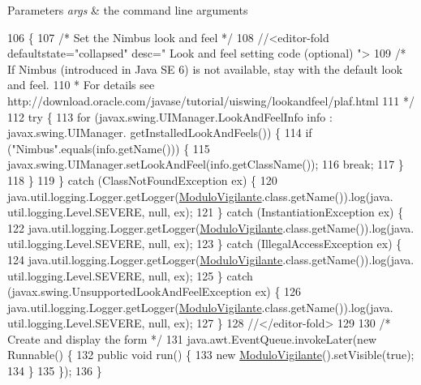 \begin{DoxyParams}{Parameters}
{\em args} & the command line arguments \\
\hline
\end{DoxyParams}

\begin{DoxyCode}
106                                            \{
107         \textcolor{comment}{/* Set the Nimbus look and feel */}
108         \textcolor{comment}{//<editor-fold defaultstate="collapsed" desc=" Look and feel setting code (optional) ">}
109         \textcolor{comment}{/* If Nimbus (introduced in Java SE 6) is not available, stay with the default look and feel.}
110 \textcolor{comment}{         * For details see http://download.oracle.com/javase/tutorial/uiswing/lookandfeel/plaf.html }
111 \textcolor{comment}{         */}
112         \textcolor{keywordflow}{try} \{
113             \textcolor{keywordflow}{for} (javax.swing.UIManager.LookAndFeelInfo info : javax.swing.UIManager.
      getInstalledLookAndFeels()) \{
114                 \textcolor{keywordflow}{if} (\textcolor{stringliteral}{"Nimbus"}.equals(info.getName())) \{
115                     javax.swing.UIManager.setLookAndFeel(info.getClassName());
116                     \textcolor{keywordflow}{break};
117                 \}
118             \}
119         \} \textcolor{keywordflow}{catch} (ClassNotFoundException ex) \{
120             java.util.logging.Logger.getLogger(\mbox{\hyperlink{classpecl6part2_1_1_modulo_vigilante_a1ae677df7d37e3ef8303a33e80513d0f}{ModuloVigilante}}.class.getName()).log(java.
      util.logging.Level.SEVERE, null, ex);
121         \} \textcolor{keywordflow}{catch} (InstantiationException ex) \{
122             java.util.logging.Logger.getLogger(\mbox{\hyperlink{classpecl6part2_1_1_modulo_vigilante_a1ae677df7d37e3ef8303a33e80513d0f}{ModuloVigilante}}.class.getName()).log(java.
      util.logging.Level.SEVERE, null, ex);
123         \} \textcolor{keywordflow}{catch} (IllegalAccessException ex) \{
124             java.util.logging.Logger.getLogger(\mbox{\hyperlink{classpecl6part2_1_1_modulo_vigilante_a1ae677df7d37e3ef8303a33e80513d0f}{ModuloVigilante}}.class.getName()).log(java.
      util.logging.Level.SEVERE, null, ex);
125         \} \textcolor{keywordflow}{catch} (javax.swing.UnsupportedLookAndFeelException ex) \{
126             java.util.logging.Logger.getLogger(\mbox{\hyperlink{classpecl6part2_1_1_modulo_vigilante_a1ae677df7d37e3ef8303a33e80513d0f}{ModuloVigilante}}.class.getName()).log(java.
      util.logging.Level.SEVERE, null, ex);
127         \}
128         \textcolor{comment}{//</editor-fold>}
129 
130         \textcolor{comment}{/* Create and display the form */}
131         java.awt.EventQueue.invokeLater(\textcolor{keyword}{new} Runnable() \{
132             \textcolor{keyword}{public} \textcolor{keywordtype}{void} run() \{
133                 \textcolor{keyword}{new} \mbox{\hyperlink{classpecl6part2_1_1_modulo_vigilante_a1ae677df7d37e3ef8303a33e80513d0f}{ModuloVigilante}}().setVisible(\textcolor{keyword}{true});
134             \}
135         \});
136     \}
\end{DoxyCode}


